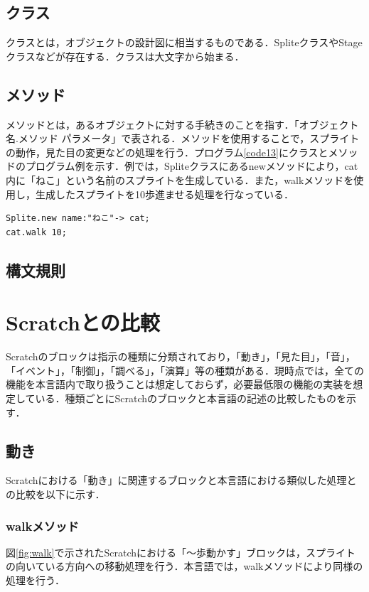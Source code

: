 \documentclass[10pt,a4j]{ltjsarticle}
\begin{document}
\subsection{クラス}
クラスとは，オブジェクトの設計図に相当するものである．SpliteクラスやStageクラスなどが存在する．クラスは大文字から始まる．

\subsection{メソッド}
メソッドとは，あるオブジェクトに対する手続きのことを指す．「オブジェクト名.メソッド パラメータ」で表される．メソッドを使用することで，スプライトの動作，見た目の変更などの処理を行う．プログラム\ref{code13}にクラスとメソッドのプログラム例を示す．例では，Spliteクラスにあるnewメソッドにより，cat内に「ねこ」という名前のスプライトを生成している．また，walkメソッドを使用し，生成したスプライトを10歩進ませる処理を行なっている．

\begin{lstlisting}[caption=クラスとメソッドのプログラム例, label=code13]
Splite.new name:"ねこ"-> cat;
cat.walk 10; 
\end{lstlisting}

\subsection{構文規則}

\clearpage

\section{Scratchとの比較}
Scratchのブロックは指示の種類に分類されており，「動き」，「見た目」，「音」，「イベント」，「制御」，「調べる」，「演算」等の種類がある．現時点では，全ての機能を本言語内で取り扱うことは想定しておらず，必要最低限の機能の実装を想定している．種類ごとにScratchのブロックと本言語の記述の比較したものを示す．

\subsection{動き}
Scratchにおける「動き」に関連するブロックと本言語における類似した処理との比較を以下に示す．
\subsubsection{walkメソッド}
図\ref{fig:walk}で示されたScratchにおける「〜歩動かす」ブロックは，スプライトの向いている方向への移動処理を行う．本言語では，walkメソッドにより同様の処理を行う．
\end{document}
